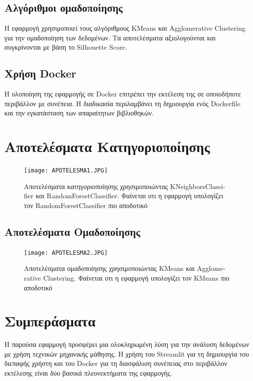 \documentclass[a4paper,12pt]{article}
\begin{document}
\begin{itemize}
\subsection{Αλγόριθμοι ομαδοποίησης}
Η εφαρμογή χρησιμοποιεί τους αλγόριθμους \textlatin{KMeans} και \textlatin{Agglomerative Clustering} για την ομαδοποίηση των δεδομένων. Τα αποτελέσματα αξιολογούνται και συγκρίνονται με βάση το \textlatin{Silhouette Score}.

\subsection{Χρήση \textlatin{Docker}}
Η υλοποίηση της εφαρμογής σε \textlatin{Docker} επιτρέπει την εκτέλεση της σε οποιοδήποτε περιβάλλον με συνέπεια. Η διαδικασία περιλαμβάνει τη δημιουργία ενός \textlatin{Dockerfile} και την εγκατάσταση των απαραίτητων βιβλιοθηκών.

\section{Αποτελέσματα Κατηγοριοποίησης}
\begin{figure}[h!]
\centering
\texttt{[image: APOTELESMA1.JPG]}
\caption{Αποτελέσματα κατηγοριοποίησης χρησιμοποιώντας \textlatin{KNeighborsClassifier} και \textlatin{RandomForestClassifier}. Φαίνεται οτι η εφαρμογή υπολογίζει τον \textlatin{RandomForestClassifier} πιο αποδοτικό }
\end{figure}

\subsection{Αποτελέσματα Ομαδοποίησης}
\begin{figure}[h!]
\centering
\texttt{[image: APOTELESMA2.JPG]}
\caption{Αποτελέσματα ομαδοποίησης χρησιμοποιώντας \textlatin{KMeans} και \textlatin{Agglomerative Clustering}. Φαίνεται οτι η εφαρμογή υπολογίζει τον \textlatin{KMeans} πιο αποδοτικό}
\end{figure}

\section{Συμπεράσματα}
\label{sec:conclusion}
Η παρούσα εφαρμογή προσφέρει μια ολοκληρωμένη λύση για την ανάλυση δεδομένων με χρήση τεχνικών μηχανικής μάθησης. Η χρήση του \textlatin{Streamlit} για τη δημιουργία του διεπαφής χρήστη και του \textlatin{Docker} για τη διασφάλιση συνέπειας στο περιβάλλον εκτέλεσης είναι δύο βασικά πλεονεκτήματα της εφαρμογής.


\end{itemize}
\end{document}
